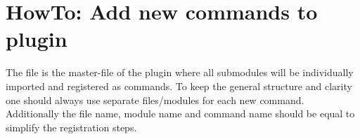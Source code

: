 \documentclass[letterpaper,10pt,english]{sphinxmanual}
\begin{document}
\begin{fulllineitems}
\begin{quote}
\begin{description}
\end{description}\end{quote}
\begin{description}
\item[{}] \leavevmode
\begin{sphinxVerbatim}[commandchars=\\\{\}]
   
  \PYG{p}{[}\PYG{p}{[}  \PYG{p}{]}    \PYG{p}{]}
\PYG{p}{[}\PYG{p}{]} \PYG{p}{[}\PYG{p}{]} \PYG{p}{[}\PYG{p}{]}

  
   \PYG{p}{[}\PYG{p}{[}\PYG{p}{[}\PYG{p}{]}\PYG{p}{]} \PYG{p}{[}\PYG{p}{[}\PYG{p}{]}\PYG{p}{]} \PYG{p}{[}\PYG{p}{[}\PYG{p}{]}\PYG{p}{]}    \PYG{p}{]}
\end{sphinxVerbatim}

\end{description}

\end{fulllineitems}



\chapter{HowTo: Add new commands to plugin }
\label{\detokenize{index:howto-add-new-commands-to-plugin-proklaue}}
The file  is the master-file of the plugin where all submodules will be individually imported and registered as commands. To keep the general structure and clarity one should always use separate files/modules for each new command. Additionally the file name, module name and command name should be equal to simplify the registration steps.
\end{document}
